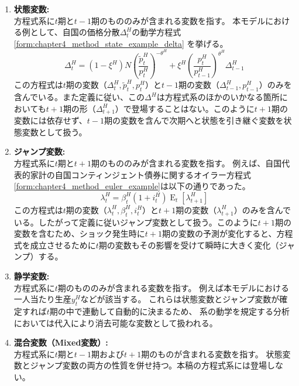 \begin{enumerate}
    \item
    \label{itm:chapter4_method_variables_state}
        \textbf{状態変数:}\\
        方程式系に\(t\)期と\(t-1\)期のもののみが含まれる変数を指す。
        本モデルにおける例として、自国の価格分散\(\Delta_t^H\)の動学方程式
        \eqref{form:chapter4_method_state_example_delta}
        を挙げる。
        \begin{equation}
        \label{form:chapter4_method_state_example_delta}
            \Delta_t^H
            =(1-\xi^H)N\left(\frac{\widetilde{p}_t^H}{p_t^H}\right)^{-\theta^H}+\xi^H\left(\frac{p_t^H}{p_{t-1}^H}\right)^{\theta^H}\Delta_{t-1}^H
        \end{equation}
        この方程式は\(t\)期の変数（\(\Delta_t^H,\widetilde{p}_t^H,p_t^H\)）と\(t-1\)期の変数（\(\Delta_{t-1}^H,p_{t-1}^H\)）のみを含んでいる。また定義に従い、この\(\Delta^H\)は方程式系のほかのいかなる箇所においても\(t+1\)期の形（\(\Delta_{t+1}^H\)）で登場することはない。このように\(t+1\)期の変数には依存せず、\(t-1\)期の変数を含んで次期へと状態を引き継ぐ変数を状態変数として扱う。
    \item
    \label{itm:chapter4_method_variables_jump}
        \textbf{ジャンプ変数:}\\
        方程式系に\(t\)期と\(t+1\)期のもののみが含まれる変数を指す。
        例えば、自国代表的家計の自国コンティンジェント債券に関するオイラー方程式\eqref{form:chapter4_method_euler_example}は以下の通りであった。
        \begin{equation}
        \label{form:chapter4_method_euler_example}
            \lambda_t^H=\beta_t^H(1+i_t^H)\operatorname{E}_t[\lambda_{t+1}^H]
        \end{equation}
        この方程式は\(t\)期の変数（\(\lambda_t^H,\beta_t^H,i_t^H\)）と\(t+1\)期の変数（\(\lambda_{t+1}^H\)）のみを含んでいる。したがって定義に従いジャンプ変数として扱う。このように\(t+1\)期の変数を含むため、ショック発生時に\(t+1\)期の変数の予測が変化すると、方程式を成立させるために\(t\)期の変数もその影響を受けて瞬時に大きく変化（ジャンプ）する。
    \item
    \label{itm:chapter4_method_variables_static}
        \textbf{静学変数:}\\
        方程式系に\(t\)期のもののみが含まれる変数を指す。
        例えば本モデルにおける一人当たり生産\(y_t^H\)などが該当する。
        これらは状態変数とジャンプ変数が確定すれば\(t\)期の中で連動して自動的に決まるため、
        系の動学を規定する分析においては代入により消去可能な変数として扱われる。
    \item
    \label{itm:chapter4_method_variables_mixed}
        \textbf{混合変数（Mixed変数）:}\\
        方程式系に\(t\)期と\(t-1\)期および\(t+1\)期のものが含まれる変数を指す。
        状態変数とジャンプ変数の両方の性質を併せ持つ。本稿の方程式系には登場しない。
\end{enumerate}

